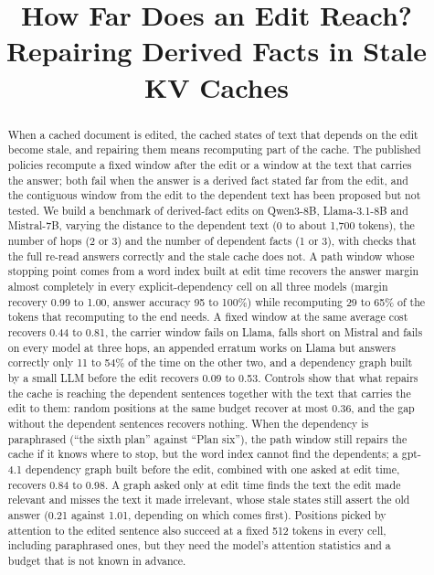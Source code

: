 \documentclass[conference]{IEEEtran}
\begin{document}
\title{How Far Does an Edit Reach?\\
{\Large Repairing Derived Facts in Stale KV Caches}}

\author{
}

\maketitle

\begin{abstract}
When a cached document is edited, the cached states of text that depends on the edit become stale, and
repairing them means recomputing part of the cache. The published policies recompute a fixed window after
the edit or a window at the text that carries the answer; both fail when the answer is a derived fact stated
far from the edit, and the contiguous window from the edit to the dependent text has been proposed but not
tested. We build a benchmark of derived-fact edits on Qwen3-8B, Llama-3.1-8B and Mistral-7B, varying the
distance to the dependent text (0 to about 1,700 tokens), the number of hops (2 or 3) and the number of
dependent facts (1 or 3), with checks that the full re-read answers correctly and the stale cache does not. A
path window whose stopping point comes from a word index built at edit time recovers the answer margin almost
completely in every explicit-dependency cell on all three models (margin recovery 0.99 to 1.00, answer accuracy 95
to 100\%) while
recomputing 29 to 65\% of the tokens that recomputing to the end needs. A fixed window at the same average
cost recovers 0.44 to 0.81, the carrier window fails on Llama, falls short on Mistral and fails on every model at
three hops, an
appended erratum works on Llama but answers correctly only 11 to 54\% of the time on the other two, and a
dependency graph built by a small LLM before the edit recovers 0.09 to 0.53. Controls show that what repairs
the cache is reaching the dependent sentences together with the text that carries the edit to them: random
positions at the same budget recover at most 0.36, and the gap without the dependent sentences recovers
nothing. When the dependency is paraphrased (``the sixth plan'' against ``Plan six''), the path window still
repairs the cache if it knows where to stop, but the word index cannot find the dependents; a gpt-4.1
dependency graph built before the edit, combined with one asked at edit time, recovers 0.84 to 0.98. A graph
asked only at edit time finds the text the edit made relevant and misses the text it made irrelevant, whose
stale states still assert the old answer (0.21 against 1.01, depending on which comes first). Positions picked
by attention to the edited sentence also succeed at a fixed 512 tokens in every cell, including paraphrased
ones, but they need the model's attention statistics and a budget that is not known in advance.
\end{abstract}
\end{document}
